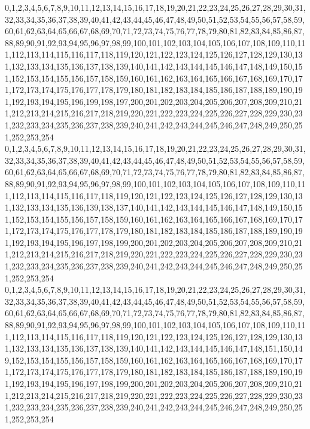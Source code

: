 \documentclass[12pt]{article}
\begin{document}
{0,1,2,3,4,5,6,7,8,9,10,11,12,13,14,15,16,17,18,19,20,21,22,23,24,25,26,27,28,29,30,31,32,33,34,35,36,37,38,39,40,41,42,43,44,45,46,47,48,49,50,51,52,53,54,55,56,57,58,59,60,61,62,63,64,65,66,67,68,69,70,71,72,73,74,75,76,77,78,79,80,81,82,83,84,85,86,87,88,89,90,91,92,93,94,95,96,97,98,99,100,101,102,103,104,105,106,107,108,109,110,111,112,113,114,115,116,117,118,119,120,121,122,123,124,125,126,127,128,129,130,131,132,133,134,135,136,137,138,139,140,141,142,143,144,145,146,147,148,149,150,151,152,153,154,155,156,157,158,159,160,161,162,163,164,165,166,167,168,169,170,171,172,173,174,175,176,177,178,179,180,181,182,183,184,185,186,187,188,189,190,191,192,193,194,195,196,199,198,197,200,201,202,203,204,205,206,207,208,209,210,211,212,213,214,215,216,217,218,219,220,221,222,223,224,225,226,227,228,229,230,231,232,233,234,235,236,237,238,239,240,241,242,243,244,245,246,247,248,249,250,251,252,253,254\\
0,1,2,3,4,5,6,7,8,9,10,11,12,13,14,15,16,17,18,19,20,21,22,23,24,25,26,27,28,29,30,31,32,33,34,35,36,37,38,39,40,41,42,43,44,45,46,47,48,49,50,51,52,53,54,55,56,57,58,59,60,61,62,63,64,65,66,67,68,69,70,71,72,73,74,75,76,77,78,79,80,81,82,83,84,85,86,87,88,89,90,91,92,93,94,95,96,97,98,99,100,101,102,103,104,105,106,107,108,109,110,111,112,113,114,115,116,117,118,119,120,121,122,123,124,125,126,127,128,129,130,131,132,133,134,135,136,139,138,137,140,141,142,143,144,145,146,147,148,149,150,151,152,153,154,155,156,157,158,159,160,161,162,163,164,165,166,167,168,169,170,171,172,173,174,175,176,177,178,179,180,181,182,183,184,185,186,187,188,189,190,191,192,193,194,195,196,197,198,199,200,201,202,203,204,205,206,207,208,209,210,211,212,213,214,215,216,217,218,219,220,221,222,223,224,225,226,227,228,229,230,231,232,233,234,235,236,237,238,239,240,241,242,243,244,245,246,247,248,249,250,251,252,253,254\\
0,1,2,3,4,5,6,7,8,9,10,11,12,13,14,15,16,17,18,19,20,21,22,23,24,25,26,27,28,29,30,31,32,33,34,35,36,37,38,39,40,41,42,43,44,45,46,47,48,49,50,51,52,53,54,55,56,57,58,59,60,61,62,63,64,65,66,67,68,69,70,71,72,73,74,75,76,77,78,79,80,81,82,83,84,85,86,87,88,89,90,91,92,93,94,95,96,97,98,99,100,101,102,103,104,105,106,107,108,109,110,111,112,113,114,115,116,117,118,119,120,121,122,123,124,125,126,127,128,129,130,131,132,133,134,135,136,137,138,139,140,141,142,143,144,145,146,147,148,151,150,149,152,153,154,155,156,157,158,159,160,161,162,163,164,165,166,167,168,169,170,171,172,173,174,175,176,177,178,179,180,181,182,183,184,185,186,187,188,189,190,191,192,193,194,195,196,197,198,199,200,201,202,203,204,205,206,207,208,209,210,211,212,213,214,215,216,217,218,219,220,221,222,223,224,225,226,227,228,229,230,231,232,233,234,235,236,237,238,239,240,241,242,243,244,245,246,247,248,249,250,251,252,253,254\\
}
\end{document}
